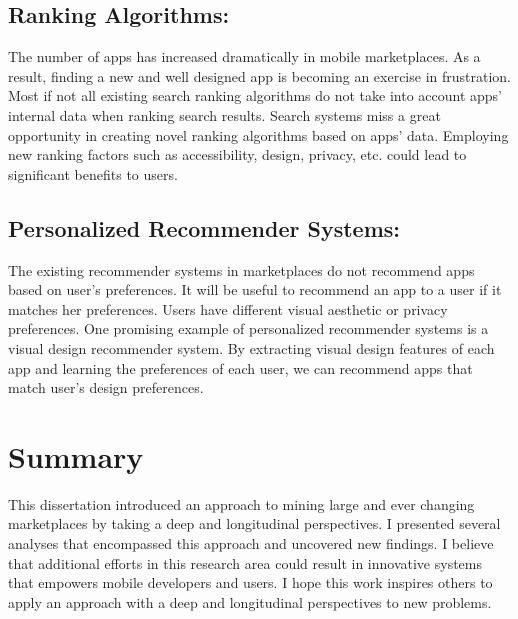 \subsection*{Ranking Algorithms:}
The number of apps has increased dramatically in mobile marketplaces.
As a result, finding a new and well designed app is becoming an exercise in frustration.
Most if not all existing search ranking algorithms do not take into account apps' internal data when ranking search results.
Search systems miss a great opportunity in creating novel ranking algorithms based on apps' data.
Employing new ranking factors such as accessibility, design, privacy, etc. could lead to significant benefits to users.

\subsection*{Personalized Recommender Systems:}
The existing recommender systems in marketplaces do not recommend apps based on user's preferences.
It will be useful to recommend an app to a user if it matches her preferences.
Users have different visual aesthetic or privacy preferences.
One promising example of personalized recommender systems is a visual design recommender system.
By extracting visual design features of each app and learning the preferences of each user, we can recommend apps that match user's design preferences.

\section{Summary}
This dissertation introduced an approach to mining large and ever changing marketplaces by taking a deep and longitudinal perspectives.
I presented several analyses that encompassed this approach and uncovered new findings.
I believe that additional efforts in this research area could result in innovative systems that empowers mobile developers and users.
I hope this work inspires others to apply an approach with a deep and longitudinal perspectives to new problems.